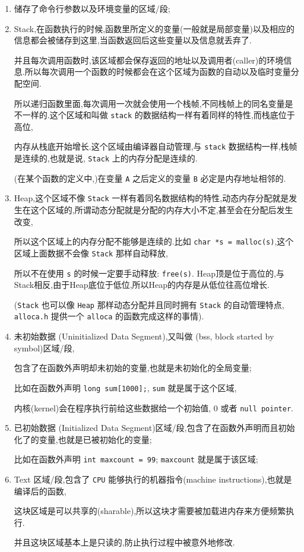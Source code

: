 \documentclass[11pt]{article}
\begin{document}
\begin{enumerate}
\item 储存了命令行参数以及环境变量的区域/段;

\item Stack,在函数执行的时候,函数里所定义的变量(一般就是局部变量)以及相应的信息都会被储存到这里,当函数返回后这些变量以及信息就丢弃了.

并且每次调用函数时,该区域都会保存返回的地址以及调用者(caller)的环境信息.所以每次调用一个函数的时候都会在这个区域为函数的自动以及临时变量分配空间.

所以递归函数里面,每次调用一次就会使用一个栈帧,不同栈帧上的同名变量是不一样的.这个区域和叫做 \texttt{stack} 的数据结构一样有着同样的特性,而栈底位于高位,

内存从栈底开始增长.这个区域由编译器自动管理,与 \texttt{stack} 数据结构一样,栈帧是连续的,也就是说, \texttt{Stack} 上的内存分配是连续的.

(在某个函数的定义中,)在变量 \texttt{A} 之后定义的变量 \texttt{B} 必定是内存地址相邻的.

\item Heap,这个区域不像 \texttt{Stack} 一样有着同名数据结构的特性,动态内存分配就是发生在这个区域的,所谓动态分配就是分配的内存大小不定,甚至会在分配后发生改变,

所以这个区域上的内存分配不能够是连续的.比如 \texttt{char *s = malloc(s)},这个区域上面数据不会像 \texttt{Stack} 那样自动释放,

所以不在使用 \texttt{s} 的时候一定要手动释放: \texttt{free(s)}. Heap顶是位于高位的,与Stack相反,由于Heap底位于低位,所以Heap的内存是从低位往高位增长.

(\texttt{Stack} 也可以像 \texttt{Heap} 那样动态分配并且同时拥有 \texttt{Stack} 的自动管理特点, \texttt{alloca.h} 提供一个 \texttt{alloca} 的函数完成这样的事情).

\item 未初始数据 (Uninitialized Data Segment),又叫做 (bss, block started by symbol)区域/段,

包含了在函数外声明却未初始的变量,也就是未初始化的全局变量;

比如在函数外声明 \texttt{long sum[1000];}, \texttt{sum} 就是属于这个区域,

内核(kernel)会在程序执行前给这些数据给一个初始值, 0 或者 \texttt{null pointer}.

\item 已初始数据 (Initialized Data Segment)区域/段,包含了在函数外声明而且初始化了的变量,也就是已被初始化的变量;

比如在函数外声明 \texttt{int maxcount = 99}; \texttt{maxcount} 就是属于该区域;

\item Text 区域/段,包含了 \texttt{CPU} 能够执行的机器指令(machine instructions),也就是编译后的函数,

这块区域是可以共享的(sharable),所以这块才需要被加载进内存来方便频繁执行.

并且这块区域基本上是只读的,防止执行过程中被意外地修改.
\end{enumerate}
\end{document}
